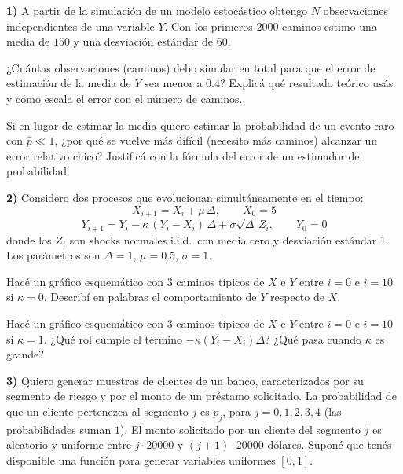 \documentclass[11pt]{article}
\begin{document}

\noindent\textbf{1)} A partir de la simulación de un modelo estocástico obtengo $N$ observaciones independientes de una variable $Y$. Con los primeros $2000$ caminos estimo una media de $150$ y una desviación estándar de $60$.

\medskip
{} ¿Cuántas observaciones (caminos) debo simular en total para que el error de estimación de la media de $Y$ sea menor a $0.4$? Explicá qué resultado teórico usás y cómo escala el error con el número de caminos.

\espacio{4.5cm}

 Si en lugar de estimar la media quiero estimar la probabilidad de un evento raro con $\hat p \ll 1$, ¿por qué se vuelve más difícil (necesito más caminos) alcanzar un error relativo chico? Justificá con la fórmula del error de un estimador de probabilidad.

\espacio{4cm}

\noindent\textbf{2)} Considero dos procesos que evolucionan simultáneamente en el tiempo:
\[
X_{i+1} = X_i + \mu\,\Delta, \qquad X_0 = 5
\]
\[
Y_{i+1} = Y_i - \kappa\,(Y_i - X_i)\,\Delta + \sigma\sqrt{\Delta}\,Z_i, \qquad Y_0 = 0
\]
donde los $Z_i$ son shocks normales i.i.d.\ con media cero y desviación estándar $1$. Los parámetros son $\Delta = 1$, $\mu = 0.5$, $\sigma = 1$.

\medskip
{} Hacé un gráfico esquemático con $3$ caminos típicos de $X$ e $Y$ entre $i=0$ e $i=10$ si $\kappa = 0$. Describí en palabras el comportamiento de $Y$ respecto de $X$.

\espacio{5cm}

 Hacé un gráfico esquemático con $3$ caminos típicos de $X$ e $Y$ entre $i=0$ e $i=10$ si $\kappa = 1$. ¿Qué rol cumple el término $-\kappa(Y_i - X_i)\Delta$? ¿Qué pasa cuando $\kappa$ es grande?

\espacio{5cm}

\noindent\textbf{3)} Quiero generar muestras de clientes de un banco, caracterizados por su segmento de riesgo y por el monto de un préstamo solicitado. La probabilidad de que un cliente pertenezca al segmento $j$ es $p_j$, para $j = 0,1,2,3,4$ (las probabilidades suman $1$). El monto solicitado por un cliente del segmento $j$ es aleatorio y uniforme entre $j\cdot 20000$ y $(j+1)\cdot 20000$ dólares. Suponé que tenés disponible una función para generar variables uniformes $[0,1]$.
\end{document}
